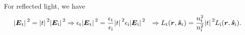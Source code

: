 \documentclass[hyperref, a4paper]{article}
\def\\{}%
\begin{document}
For reflected light, we have 
\begin{equation}
    \begin{aligned}
        \abs*{\vb*{E}_{\text{t}}}^2 = \abs*{t}^2 \abs*{\vb*{E}_{\text{i}}}^2 
        &\Rightarrow \epsilon_{\text{t}} \abs*{\vb*{E}_{\text{t}}}^2 
        = \frac{\epsilon_{\text{t}}}{\epsilon_{\text{i}}} \abs*{t}^2 \epsilon_{\text{i}} \abs*{\vb*{E}_{\text{i}}}^2 \\
        &\Rightarrow L_{\text{t}}(\vb*{r}, \vu*{s}_{\text{t}}) 
        = \frac{n_{\text{t}}^2}{n_{\text{i}}^2} \abs*{t}^2 L_{\text{i}}(\vb*{r}, \vu*{s}_{\text{i}}).
    \end{aligned}
\end{equation}
\end{document}
